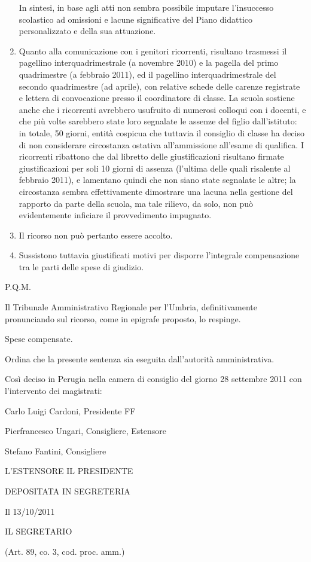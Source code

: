 \begin{enumerate}
	In sintesi, in base agli atti non sembra possibile imputare l'insuccesso scolastico ad omissioni e lacune significative del Piano didattico personalizzato e della sua attuazione.
	\item Quanto alla comunicazione con i genitori ricorrenti, risultano trasmessi il pagellino interquadrimestrale (a novembre 2010) e la pagella del primo quadrimestre (a febbraio 2011), ed il pagellino interquadrimestrale del secondo quadrimestre (ad aprile), con relative schede delle carenze registrate e lettera di convocazione presso il coordinatore di classe. La scuola sostiene anche che i ricorrenti avrebbero usufruito di numerosi colloqui con i docenti, e che più volte sarebbero state loro segnalate le assenze del figlio dall'istituto: in totale, 50 giorni, entità cospicua che tuttavia il consiglio di classe ha deciso di non considerare circostanza ostativa all'ammissione all'esame di qualifica. I ricorrenti ribattono che dal libretto delle giustificazioni risultano firmate giustificazioni per soli 10 giorni di assenza (l'ultima delle quali risalente al febbraio 2011), e lamentano quindi che non siano state segnalate le altre; la circostanza sembra effettivamente dimostrare una lacuna nella gestione del rapporto da parte della scuola, ma tale rilievo, da solo, non può evidentemente inficiare il provvedimento impugnato.
	\item Il ricorso non può pertanto essere accolto.
	\item  Sussistono tuttavia giustificati motivi per disporre l'integrale compensazione tra le parti delle spese di giudizio.
	\end{enumerate}
\begin{center}
P.Q.M.
\end{center}

Il Tribunale Amministrativo Regionale per l'Umbria, definitivamente pronunciando sul ricorso, come in epigrafe proposto, lo respinge.

Spese compensate.

Ordina che la presente sentenza sia eseguita dall'autorità amministrativa.

Così deciso in Perugia nella camera di consiglio del giorno 28 settembre 2011 con l'intervento dei magistrati:

Carlo Luigi Cardoni, Presidente FF

Pierfrancesco Ungari, Consigliere, Estensore

Stefano Fantini, Consigliere

L'ESTENSORE			IL PRESIDENTE

DEPOSITATA IN SEGRETERIA

Il 13/10/2011

IL SEGRETARIO

(Art. 89, co. 3, cod. proc. amm.)
